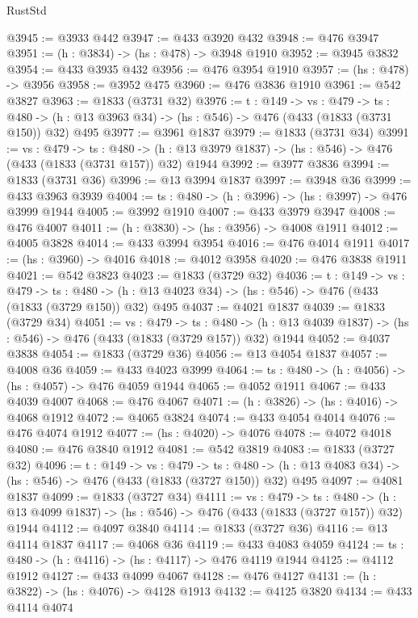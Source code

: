 \begin{lexlean}{RustStd}
\begin{coremodule}
@3945 := @3933 @442
@3947 := @433 @3920 @432
@3948 := @476 @3947
@3951 := (h : @3834) -> (hs : @478) -> @3948 @1910
@3952 := @3945 @3832
@3954 := @433 @3935 @432
@3956 := @476 @3954 @1910
@3957 := (hs : @478) -> @3956
@3958 := @3952 @475
@3960 := @476 @3836 @1910
@3961 := @542 @3827
@3963 := @1833 (@3731 @32)
@3976 := {t : @149} ->
  {vs : @479} ->
  {ts : @480} -> (h : @13 @3963 @34) -> (hs : @546) -> @476 (@433 (@1833 (@3731 @150)) @32) @495
@3977 := @3961 @1837
@3979 := @1833 (@3731 @34)
@3991 := {vs : @479} ->
  {ts : @480} -> (h : @13 @3979 @1837) -> (hs : @546) -> @476 (@433 (@1833 (@3731 @157)) @32) @1944
@3992 := @3977 @3836
@3994 := @1833 (@3731 @36)
@3996 := @13 @3994 @1837
@3997 := @3948 @36
@3999 := @433 @3963 @3939
@4004 := {ts : @480} -> (h : @3996) -> (hs : @3997) -> @476 @3999 @1944
@4005 := @3992 @1910
@4007 := @433 @3979 @3947
@4008 := @476 @4007
@4011 := (h : @3830) -> (hs : @3956) -> @4008 @1911
@4012 := @4005 @3828
@4014 := @433 @3994 @3954
@4016 := @476 @4014 @1911
@4017 := (hs : @3960) -> @4016
@4018 := @4012 @3958
@4020 := @476 @3838 @1911
@4021 := @542 @3823
@4023 := @1833 (@3729 @32)
@4036 := {t : @149} ->
  {vs : @479} ->
  {ts : @480} -> (h : @13 @4023 @34) -> (hs : @546) -> @476 (@433 (@1833 (@3729 @150)) @32) @495
@4037 := @4021 @1837
@4039 := @1833 (@3729 @34)
@4051 := {vs : @479} ->
  {ts : @480} -> (h : @13 @4039 @1837) -> (hs : @546) -> @476 (@433 (@1833 (@3729 @157)) @32) @1944
@4052 := @4037 @3838
@4054 := @1833 (@3729 @36)
@4056 := @13 @4054 @1837
@4057 := @4008 @36
@4059 := @433 @4023 @3999
@4064 := {ts : @480} -> (h : @4056) -> (hs : @4057) -> @476 @4059 @1944
@4065 := @4052 @1911
@4067 := @433 @4039 @4007
@4068 := @476 @4067
@4071 := (h : @3826) -> (hs : @4016) -> @4068 @1912
@4072 := @4065 @3824
@4074 := @433 @4054 @4014
@4076 := @476 @4074 @1912
@4077 := (hs : @4020) -> @4076
@4078 := @4072 @4018
@4080 := @476 @3840 @1912
@4081 := @542 @3819
@4083 := @1833 (@3727 @32)
@4096 := {t : @149} ->
  {vs : @479} ->
  {ts : @480} -> (h : @13 @4083 @34) -> (hs : @546) -> @476 (@433 (@1833 (@3727 @150)) @32) @495
@4097 := @4081 @1837
@4099 := @1833 (@3727 @34)
@4111 := {vs : @479} ->
  {ts : @480} -> (h : @13 @4099 @1837) -> (hs : @546) -> @476 (@433 (@1833 (@3727 @157)) @32) @1944
@4112 := @4097 @3840
@4114 := @1833 (@3727 @36)
@4116 := @13 @4114 @1837
@4117 := @4068 @36
@4119 := @433 @4083 @4059
@4124 := {ts : @480} -> (h : @4116) -> (hs : @4117) -> @476 @4119 @1944
@4125 := @4112 @1912
@4127 := @433 @4099 @4067
@4128 := @476 @4127
@4131 := (h : @3822) -> (hs : @4076) -> @4128 @1913
@4132 := @4125 @3820
@4134 := @433 @4114 @4074

\end{coremodule}
\end{lexlean}
